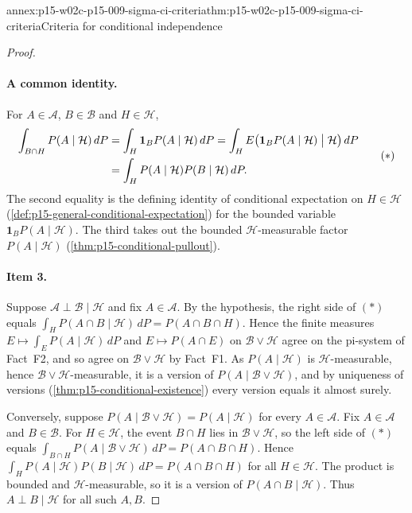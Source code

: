\begin{annexitem}{annex:p15-w02c-p15-009-sigma-ci-criteria}{thm:p15-w02c-p15-009-sigma-ci-criteria}{Criteria for conditional independence}
\begin{proof}
\paragraph{A common identity.} For \(A\in\mathcal A\), \(B\in\mathcal B\)
and \(H\in\mathcal H\),
\begin{equation}
\begin{aligned}
 \int_{B\cap H}P(A\mid\mathcal H)\,dP
 &=\int_H\mathbf1_BP(A\mid\mathcal H)\,dP
 =\int_H E\bigl(\mathbf1_BP(A\mid\mathcal H)\bigm|\mathcal H\bigr)\,dP\\
 &=\int_H P(A\mid\mathcal H)P(B\mid\mathcal H)\,dP .
\end{aligned}
 \tag{\(*\)}
\end{equation}
The second equality is the defining identity of conditional expectation on
\(H\in\mathcal H\) (\cref{def:p15-general-conditional-expectation}) for the
bounded variable \(\mathbf1_BP(A\mid\mathcal H)\). The third takes out the
bounded \(\mathcal H\)-measurable factor \(P(A\mid\mathcal H)\)
(\cref{thm:p15-conditional-pullout}).

\paragraph{Item 3.} Suppose \(\mathcal A\perp\mathcal B\mid\mathcal H\) and
fix \(A\in\mathcal A\). By the hypothesis, the right side of \((*)\) equals
\(\int_HP(A\cap B\mid\mathcal H)\,dP=P(A\cap B\cap H)\). Hence the finite
measures \(E\mapsto\int_EP(A\mid\mathcal H)\,dP\) and
\(E\mapsto P(A\cap E)\) on \(\mathcal B\vee\mathcal H\) agree on the
pi-system of Fact~F2, and so agree on \(\mathcal B\vee\mathcal H\) by
Fact~F1. As \(P(A\mid\mathcal H)\) is \(\mathcal H\)-measurable, hence
\(\mathcal B\vee\mathcal H\)-measurable, it is a version of
\(P(A\mid\mathcal B\vee\mathcal H)\), and by uniqueness of versions
(\cref{thm:p15-conditional-existence}) every version equals it almost
surely.

Conversely, suppose \(P(A\mid\mathcal B\vee\mathcal H)=P(A\mid\mathcal H)\)
for every \(A\in\mathcal A\). Fix \(A\in\mathcal A\) and \(B\in\mathcal B\).
For \(H\in\mathcal H\), the event \(B\cap H\) lies in \(\mathcal B\vee\mathcal H\),
so the left side of \((*)\) equals
\(\int_{B\cap H}P(A\mid\mathcal B\vee\mathcal H)\,dP=P(A\cap B\cap H)\).
Hence \(\int_HP(A\mid\mathcal H)P(B\mid\mathcal H)\,dP=P(A\cap B\cap H)\)
for all \(H\in\mathcal H\). The product is bounded and
\(\mathcal H\)-measurable, so it is a version of \(P(A\cap B\mid\mathcal H)\).
Thus \(A\perp B\mid\mathcal H\) for all such \(A,B\).


\end{proof}
\end{annexitem}
